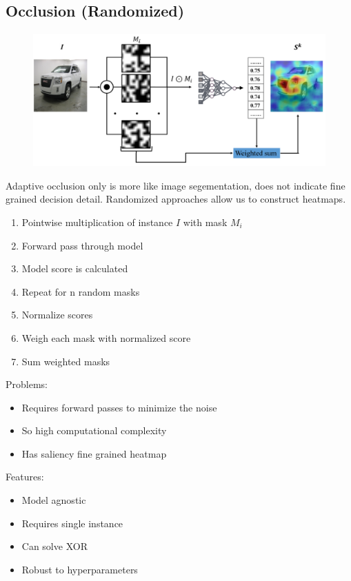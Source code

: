 \subsection{Occlusion (Randomized)}
\begin{figure}[!h]
    \includegraphics[width =  \columnwidth]{figures/XAI2/RandomizedOcclusion.png}
\end{figure}
Adaptive occlusion only is more like image segementation, does not indicate fine grained decision detail.
Randomized approaches allow us to construct heatmaps.
\begin{enumerate}
    \item Pointwise multiplication of instance \(I\) with mask \(M_i\)
    \item Forward pass through model
    \item Model score is calculated
    \item Repeat for n random masks
    \item Normalize scores
    \item Weigh each mask with normalized score
    \item Sum weighted masks
\end{enumerate}
Problems:
\begin{itemize}
    \item Requires forward passes to minimize the noise
    \item So high computational complexity
    \item Has saliency fine grained heatmap
\end{itemize}
Features:
\begin{itemize}
    \item Model agnostic
    \item Requires single instance
    \item Can solve XOR
    \item Robust to hyperparameters
\end{itemize}

